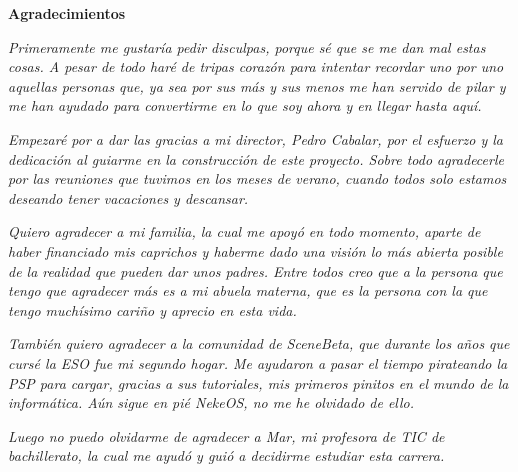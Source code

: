 \vspace*{4em}

{\Huge\bfseries{Agradecimientos}\par}

\vspace*{2em}

\textit{Primeramente me gustaría pedir disculpas, porque sé que se me dan mal estas cosas. A pesar de todo haré de tripas corazón para intentar recordar uno por uno aquellas personas que, ya sea por sus más y sus menos me han servido de pilar y me han ayudado para convertirme en lo que soy ahora y en llegar hasta aquí.}\par

\vspace*{1em}

\textit{Empezaré por a dar las gracias a mi director, Pedro Cabalar, por el esfuerzo y la dedicación al guiarme en la construcción de este proyecto. Sobre todo agradecerle por las reuniones que tuvimos en los meses de verano, cuando todos solo estamos deseando tener vacaciones y descansar.}\par

\vspace*{1em}

\textit{Quiero agradecer a mi familia, la cual me apoyó en todo momento, aparte de haber financiado mis caprichos y haberme dado una visión lo más abierta posible de la realidad que pueden dar unos padres. Entre todos creo que a la persona que tengo que agradecer más es a mi abuela materna, que es la persona con la que tengo muchísimo cariño y aprecio en esta vida.}\par

\vspace*{1em}

\textit{También quiero agradecer a la comunidad de SceneBeta, que durante los años que cursé la ESO fue mi segundo hogar. Me ayudaron a pasar el tiempo pirateando la PSP para cargar, gracias a sus tutoriales, mis primeros pinitos en el mundo de la informática. Aún sigue en pié NekeOS, no me he olvidado de ello.}\par

\vspace*{1em}

\textit{Luego no puedo olvidarme de agradecer a Mar, mi profesora de TIC de bachillerato, la cual me ayudó y guió a decidirme estudiar esta carrera.}\par

\vspace*{1em}

